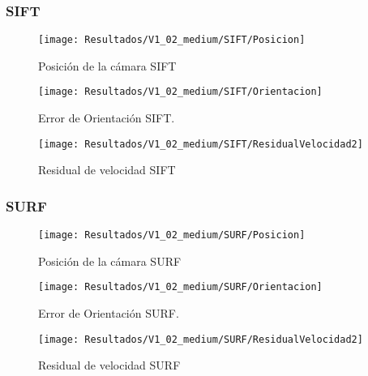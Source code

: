 \subsubsection{SIFT}


\begin{figure}[H]
	\centering
	\texttt{[image: Resultados/V1\_02\_medium/SIFT/Posicion]}
	\caption{Posición de la cámara SIFT}
	\label{imagen:Resultados/V1_02_medium/SIFT/Posicion}
\end{figure}


\begin{figure}[H]
	\centering
	\texttt{[image: Resultados/V1\_02\_medium/SIFT/Orientacion]}
	\caption[Error de Orientación SIFT]{Error de Orientación SIFT.}
	\label{imagen:Resultados/V1_02_medium/SIFT/Orientacion}
\end{figure}



\begin{figure}[H]
	\centering
	\texttt{[image: Resultados/V1\_02\_medium/SIFT/ResidualVelocidad2]}
	\caption{Residual de velocidad SIFT}
	\label{imagen:Resultados/V1_02_medium/SIFT/ResidualVelocidad}
\end{figure}

\subsubsection{SURF}


\begin{figure}[H]
	\centering
	\texttt{[image: Resultados/V1\_02\_medium/SURF/Posicion]}
	\caption{Posición de la cámara SURF}
	\label{imagen:Resultados/V1_02_medium/SURF/Posicion}
\end{figure}


\begin{figure}[H]
	\centering
	\texttt{[image: Resultados/V1\_02\_medium/SURF/Orientacion]}
	\caption[Error de Orientación SURF]{Error de Orientación SURF.}
	\label{imagen:Resultados/V1_02_medium/SURF/Orientacion}
\end{figure}



\begin{figure}[H]
	\centering
	\texttt{[image: Resultados/V1\_02\_medium/SURF/ResidualVelocidad2]}
	\caption{Residual de velocidad SURF}
	\label{imagen:Resultados/V1_02_medium/SURF/ResidualVelocidad}
\end{figure}
